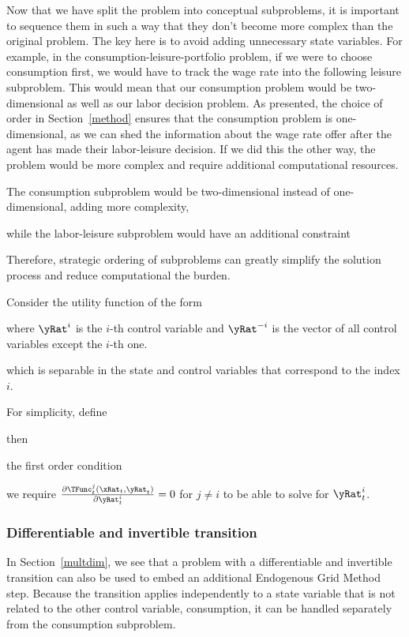 \documentclass{article}
\begin{document}
Now that we have split the problem into conceptual subproblems, it is important to sequence them in such a way that they don't become more complex than the original problem. The key here is to avoid adding unnecessary state variables. For example, in the consumption-leisure-portfolio problem, if we were to choose consumption first, we would have to track the wage rate into the following leisure subproblem. This would mean that our consumption problem would be two-dimensional as well as our labor decision problem. As presented, the choice of order in Section~\ref{method} ensures that the consumption problem is one-dimensional, as we can shed the information about the wage rate offer after the agent has made their labor-leisure decision. If we did this the other way, the problem would be more complex and require additional computational resources.

The consumption subproblem would be two-dimensional instead of one-dimensional, adding more complexity,

while the labor-leisure subproblem would have an additional constraint

Therefore, strategic ordering of subproblems can greatly simplify the solution process and reduce computational the burden.

Consider the utility function of the form

where $\yRat^{i}$ is the $i$-th control variable and $\yRat^{ -i}$ is the vector of all control variables except the $i$-th one.

which is separable in the state and control variables that correspond to the index $i$.

For simplicity, define

then

the first order condition

we require $\frac{\partial \TFunc_{t}^j(\xRat_t, \yRat_t)}{\partial \yRat_t^i} = 0$ for $j \neq i$ to be able to solve for $\yRat_t^i$.

\subsubsection{Differentiable and invertible transition}

In Section~\ref{multdim}, we see that a problem with a differentiable and invertible transition can also be used to embed an additional Endogenous Grid Method step. Because the transition applies independently to a state variable that is not related to the other control variable, consumption, it can be handled separately from the consumption subproblem.
\end{document}
